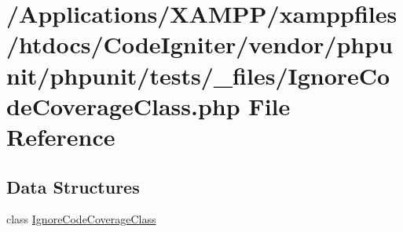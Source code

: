 \hypertarget{_ignore_code_coverage_class_8php}{}\section{/\+Applications/\+X\+A\+M\+P\+P/xamppfiles/htdocs/\+Code\+Igniter/vendor/phpunit/phpunit/tests/\+\_\+files/\+Ignore\+Code\+Coverage\+Class.php File Reference}
\label{_ignore_code_coverage_class_8php}
\subsection*{Data Structures}
\begin{DoxyCompactItemize}
\item 
class \mbox{\hyperlink{class_ignore_code_coverage_class}{Ignore\+Code\+Coverage\+Class}}
\end{DoxyCompactItemize}
